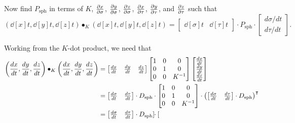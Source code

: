 \documentclass[newpage,hints,handout,noauthor,nooutcomes,12pt]{ximera}
\begin{document}
\begin{problem}
  Now find $P_\mathrm{sph}$ in terms of $K$, $\pp[x]{\sigma}$, $\pp[y]{\sigma}$,
  $\pp[z]{\sigma}$, $\pp[x]{\tau}$, $\pp[y]{\tau}$, and $\pp[z]{\tau}$
  such that
  \[
  \left(\dd[x]{t}, \dd[y]{t}, \dd[z]{t}\right)\bullet_K
  \left(\dd[x]{t}, \dd[y]{t}, \dd[z]{t}\right)
  =
  \begin{bmatrix}
    \dd[\sigma]{t} &  \dd[\tau]{t}
  \end{bmatrix}
  \cdot P_\mathrm{sph}
  \cdot
  \begin{bmatrix}
    d\sigma/dt \\  d\tau/dt
  \end{bmatrix}.
  \]
  \begin{freeResponse}
    Working from the $K$-dot product, we need that
    \begin{align*}
    \left(\dd[x]{t}, \dd[y]{t}, \dd[z]{t}\right)\bullet_K
    \left(\dd[x]{t}, \dd[y]{t}, \dd[z]{t}\right)
    &=
    \begin{bmatrix}
      \dd[x]{t} & \dd[y]{t} & \dd[z]{t}
    \end{bmatrix}
    \begin{bmatrix}
      1 & 0 & 0\\
      0 & 1 & 0\\
      0 & 0 & K^{-1}
    \end{bmatrix}
    \begin{bmatrix}
      \dd[x]{t} \\ \dd[y]{t} \\ \dd[z]{t}
    \end{bmatrix}\\
    &=
    \begin{bmatrix}
      \frac{d\sigma}{dt} & \frac{d\tau}{dt}
    \end{bmatrix}\cdot D_{\mathrm{sph}}\cdot
    \begin{bmatrix}
      1 & 0 & 0\\
      0 & 1 & 0\\
    0 & 0 & K^{-1}
    \end{bmatrix}
    \cdot
    \left(
    \begin{bmatrix}
      \frac{d\sigma}{dt} & \frac{d\tau}{dt}
    \end{bmatrix}\cdot D_{\mathrm{sph}}
    \right)^\transpose\\
    &=
    \begin{bmatrix}
      \frac{d\sigma}{dt} & \frac{d\tau}{dt}
    \end{bmatrix}\cdot D_{\mathrm{sph}}\cdot
    \begin{bmatrix}

\end{bmatrix}
\end{align*}
\end{freeResponse}
\end{problem}
\end{document}
